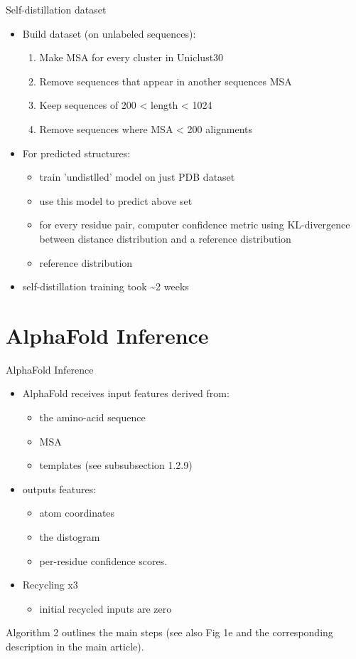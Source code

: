 \documentclass[presentation, smaller]{beamer}
\begin{document}
\begin{frame}[label={sec:org3c7f83e}]{Self-distillation dataset \cite{jumperHighlyAccurateProtein2021}}
\begin{itemize}
\item Build dataset (on unlabeled sequences):
\begin{enumerate}
\item Make MSA for every cluster in Uniclust30
\item Remove sequences that appear in another sequences MSA
\item Keep sequences of 200 < length < 1024
\item Remove sequences where MSA < 200 alignments
\end{enumerate}
\item For predicted structures:
\begin{itemize}
\item train 'undistlled' model on just PDB dataset
\item use this model to predict above set
\item for every residue pair, computer confidence metric using KL-divergence between distance distribution and a reference distribution
\item reference distribution
\end{itemize}
\item self-distillation training took \textasciitilde{}2 weeks
\end{itemize}
\end{frame}

\section*{AlphaFold Inference}
\label{sec:orgafefb76}
\begin{frame}[label={sec:org65c617b}]{AlphaFold Inference \cite{jumperHighlyAccurateProtein2021}}
\begin{itemize}
\item AlphaFold receives input features derived from:
\begin{itemize}
\item the amino-acid sequence
\item MSA
\item templates (see subsubsection 1.2.9)
\end{itemize}
\item outputs features:
\begin{itemize}
\item atom coordinates
\item the distogram
\item per-residue confidence scores.
\end{itemize}
\item Recycling x3
\begin{itemize}
\item initial recycled inputs are zero
\end{itemize}
\end{itemize}

Algorithm 2 outlines the main steps (see also Fig 1e and the corresponding description in the main article).
\end{frame}
\end{document}
